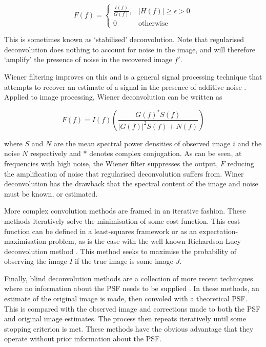 \begin{equation}
\label{eq:regularised_deconvolution}
F(f) = \begin{cases}
	\frac{I(f)}{G(f)},	& \left| H(f) \right| \ge \epsilon> 0 \\
	0					& \text{otherwise}
\end{cases}
\end{equation}

This is sometimes known as \enquote*{stabilised} deconvolution.
Note that regularised deconvolution does nothing to account for noise in the image, and will therefore \enquote*{amplify} the presence of noise in the recovered image $f'$.

Wiener filtering improves on this and is a general signal processing technique that attempts to recover an estimate of a signal in the presence of additive noise \cite{wiener1964extrapolation}.
Applied to image processing, Wiener deconvolution can be written as

\begin{equation}
\label{eq:wiener_filter}
F(f) = I(f) \left( \frac{G(f)^* S(f)}{\left| G(f) \right|^2 S(f) + N(f) } \right)
\end{equation}

\noindent
where $S$ and $N$ are the mean spectral power densities of observed image $i$ and the noise $N$ respectively and $*$ denotes complex conjugation.
As can be seen, at frequencies with high noise, the Wiener filter suppresses the output, $F$ reducing the amplification of noise that regularised deconvolution suffers from.
Winer deconvolution has the drawback that the spectral content of the image and noise must be known, or estimated.

More complex convolution methods are framed in an iterative fashion.
These methods iteratively solve the minimisation of some cost function.
This cost function can be defined in a least-squares framework \cite{ng99anew} or as an expectation-maximisation problem, as is the case with the well known Richardson-Lucy deconvolution method \cite{richarson1972bayesian}.
This method seeks to maximise the probability of observing the image $I$ if the true image is some image $J$.

Finally, blind deconvolution methods are a collection of more recent techniques where no information about the PSF needs to be supplied \cite{bell1995information, ayers1988iterative}.
In these methods, an estimate of the original image is made, then convoled with a theoretical PSF.
This is compared with the observed image and corrections made to both the PSF and original image estimates.
The process then repeats iteratively until some stopping criterion is met.
These methods have the obvious advantage that they operate without prior information about the PSF.

